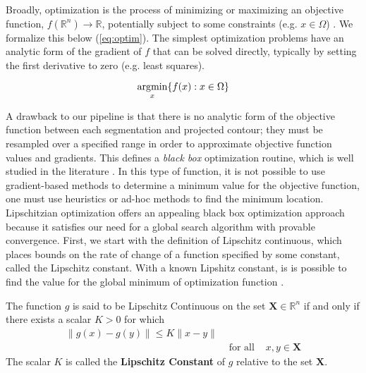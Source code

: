 Broadly, optimization is the process of minimizing or maximizing an objective function, $f(\mathbb{R}^{n}) \rightarrow \mathbb{R}$, potentially subject to some constraints (e.g. $x \in \Omega$) \cite{audetDerivativeFreeBlackboxOptimization2017}. We formalize this below (\cref{eq:optim}). The simplest optimization problems have an analytic form of the gradient of $f$ that can be solved directly, typically by setting the first derivative to zero (e.g. least squares).

\begin{equation}
    \operatorname*{\arg\!min}_{x}\{f(x) : x \in \Omega\}
    \label{eq:optim}
\end{equation}

A drawback to our pipeline is that there is no analytic form of the objective function between each segmentation and projected contour; they must be resampled over a specified range in order to approximate objective function values and gradients. This defines a \emph{black box} optimization routine, which is well studied in the literature \cite{audetDerivativeFreeBlackboxOptimization2017}. In this type of function, it is not possible to use gradient-based methods to determine a minimum value for the objective function, one must use heuristics or ad-hoc methods to find the minimum location. Lipschitzian optimization offers an appealing black box optimization approach because it satisfies our need for a global search algorithm with provable convergence. First, we start with the definition of Lipschitz continuous, which places bounds on the rate of change of a function specified by some constant, called the Lipschitz constant. With a known Lipshitz constant, is is possible to find the value for the global minimum of optimization function \cite{dreisigmeyerDIRECTSEARCHMETHODS2007}.


\begin{mdframed}
    \begin{definition}
        The function $g$ is said to be Lipschitz Continuous on the set $\mathbf{X} \in \mathbb{R}^n$ if and only if there exists a scalar $K > 0$ for which
        \begin{equation*}
            \begin{aligned}
                \|g(x) - g(y)\| \le K\|x - y\|  & \\
                &\text{  for all  }& x,y \in \mathbf{X}
            \end{aligned}
        \end{equation*}
        The scalar $K$ is called the {\bf Lipschitz Constant} of $g$ relative to the set $\mathbf{X}$.
    \end{definition}
\end{mdframed}

